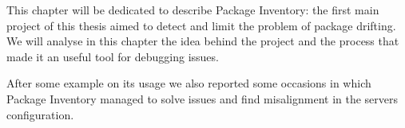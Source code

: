 
This chapter will be dedicated to describe Package Inventory: the first
main project of this thesis aimed to detect and limit the problem of
package drifting. We will analyse in this chapter the idea behind the
project and the process that made it an useful tool for debugging issues.

After some example on its usage we also reported some occasions in which
Package Inventory managed to solve issues and find misalignment in the
servers configuration.

